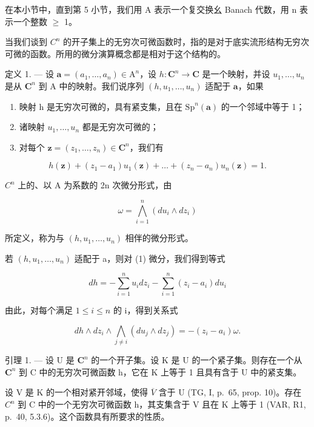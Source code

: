 在本小节中，直到第 5 小节，我们用 A 表示一个复交换幺 Banach 代数，用 n 表示一个整数 \(\geqslant\) 1。

当我们谈到 \(C^{n}\) 的开子集上的无穷次可微函数时，指的是对于底实流形结构无穷次可微的函数。所用的微分演算概念都是相对于这个结构的。

定义 1. --- 设 \(\boldsymbol{a} = (a_{1},\ldots ,a_{n})\in \mathrm{A}^{n}\)，设 \(h\colon \mathbf{C}^n\to \mathbf{C}\) 是一个映射，并设 \(u_{1},\ldots ,u_{n}\) 是从 \(\mathbf{C}^n\) 到 A 中的映射。我们说序列 \((h,u_1,\dots ,u_n)\) 适配于 \(\boldsymbol{a}\)，如果

\begin{enumerate}
\def\labelenumi{(\roman{enumi})}
\item
  映射 h 是无穷次可微的，具有紧支集，且在 \(\mathrm{Sp}^n (\boldsymbol {a})\) 的一个邻域中等于 1；
\item
  诸映射 \(u_1, \ldots, u_n\) 都是无穷次可微的；
\item
  对每个 \(\boldsymbol{z} = (z_{1},\dots ,z_{n})\in \mathbf{C}^{n}\)，我们有
\end{enumerate}

\[
h (\boldsymbol {z}) + (z _ {1} - a _ {1}) u _ {1} (\boldsymbol {z}) + \dots + (z _ {n} - a _ {n}) u _ {n} (\boldsymbol {z}) = 1.\tag{1}
\]

\(C^{n}\) 上的、以 A 为系数的 2n 次微分形式，由

\[
\omega = \bigwedge_ {i = 1} ^ {n} (d u _ {i} \wedge d z _ {i})
\]

所定义，称为与 \((h, u_1, \ldots, u_n)\) 相伴的微分形式。

若 \((h, u_{1}, \ldots, u_{n})\) 适配于 a，则对 (1) 微分，我们得到等式

\[
d h = - \sum_ {i = 1} ^ {n} u _ {i} d z _ {i} - \sum_ {i = 1} ^ {n} (z _ {i} - a _ {i}) d u _ {i}\tag{2}
\]

由此，对每个满足 \(1 \leqslant i \leqslant n\) 的 i，得到关系式

\[
d h \wedge d z _ {i} \wedge \bigwedge_ {j \neq i} (d u _ {j} \wedge d z _ {j}) = - (z _ {i} - a _ {i}) \omega .\tag{3}
\]

引理 1. --- 设 U 是 \(\mathbf{C}^{n}\) 的一个开子集。设 K 是 U 的一个紧子集。则存在一个从 \(\mathbf{C}^{n}\) 到 C 中的无穷次可微函数 h，它在 K 上等于 1 且具有含于 U 中的紧支集。

设 V 是 K 的一个相对紧开邻域，使得 \(\overline{V}\) 含于 U (TG, I, p.~65, prop. 10)。存在 \(C^{n}\) 到 C 中的一个无穷次可微函数 h，其支集含于 V 且在 K 上等于 1 (VAR, R1, p.~40, 5.3.6)。这个函数具有所要求的性质。

